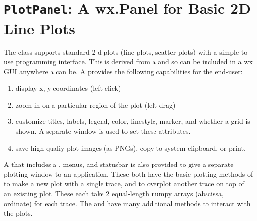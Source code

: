 \documentclass[letterpaper,10pt,english]{sphinxmanual}
\begin{document}
\chapter{\texttt{PlotPanel}:  A wx.Panel for Basic 2D Line Plots}
\label{plotpanel::doc}\label{plotpanel:plotpanel-a-wx-panel-for-basic-2d-line-plots}
The {\hyperref[plotpanel:PlotPanel]{}} class supports standard 2-d plots (line plots,
scatter plots) with a simple-to-use programming interface.  This is derived
from a  and so can be included in a wx GUI anywhere a
 can be.   A {\hyperref[plotpanel:PlotPanel]{}} provides the following
capabilities for the end-user:
\begin{enumerate}
\item {} 
display x, y coordinates (left-click)

\item {} 
zoom in on a particular region of the plot (left-drag)

\item {} 
customize titles, labels, legend, color, linestyle, marker,
and whether a grid is shown.  A separate window is used to
set these attributes.

\item {} 
save high-qualiy plot images (as PNGs), copy to system
clipboard, or print.

\end{enumerate}

A {\hyperref[plotpanel:PlotFrame]{}} that includes a {\hyperref[plotpanel:PlotPanel]{}}, menus, and
statusbar is also provided to give a separate plotting window to an
application.  These both have the basic plotting methods of {\hyperref[plotpanel:plot]{}} to
make a new plot with a single trace, and {\hyperref[plotpanel:oplot]{}} to overplot another
trace on top of an existing plot.  These each
take 2 equal-length numpy arrays (abscissa, ordinate) for each trace.
The {\hyperref[plotpanel:PlotPanel]{}} and {\hyperref[plotpanel:PlotFrame]{}} have many additional methods
to interact with the plots.

\end{document}
